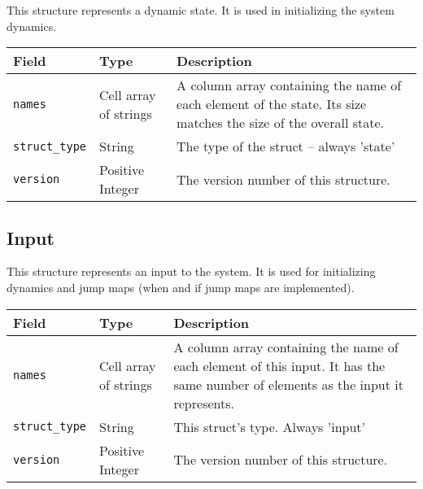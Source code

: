 \documentclass{article}
\begin{document}
			This structure represents a dynamic state. It is used in initializing the system dynamics.\nopagebreak

			\vspace{\baselineskip}\nopagebreak

			\begin{tabular}{ p{} | p{} | p{}}
				Field                    & Type    & Description                                                                 \\ \hline
				\lstinline|names|        & \raggedright Cell array of strings & A column array containing the name of each element of
				                                                   the state. Its size matches the size of the overall state.    \\[1ex]
				\lstinline|struct_type|  & String  & The type of the struct -- always 'state'                                    \\[1ex]
				\lstinline|version|      & \raggedright Positive Integer & The version number of this structure.
			\end{tabular}

		\subsection{Input}
			\label{sec:input} %

			This structure represents an input to the system. It is used for initializing dynamics and jump maps (when and if
			jump maps are implemented).\nopagebreak

			\vspace{\baselineskip}\nopagebreak

			\begin{tabular}{ p{} | p{} | p{}}
				Field                    & Type                               & Description                                      \\ \hline
				\lstinline|names|        & \raggedright Cell array of strings & A column array containing the name of each element of
												this input. It has the same number of elements as the
												input it represents.                             \\[1ex]
				\lstinline|struct_type|  & String                             & This struct's type. Always 'input'               \\[1ex]
				\lstinline|version|      & \raggedright Positive Integer      & The version number of this structure.
			\end{tabular}
\end{document}
